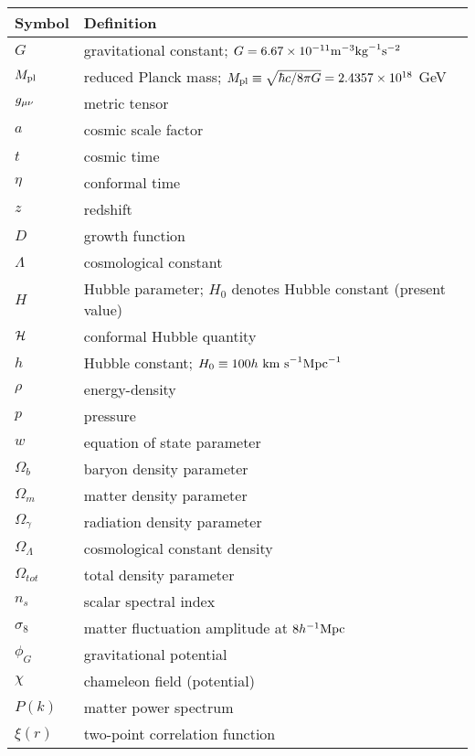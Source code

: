 
\begin{tabular}{ll}
\hline\hline
Symbol & Definition \\
\hline
$G$ & gravitational constant; $G=6.67\times10^{-11}\rm{m}^{-3}\rm{kg}^{-1}\rm{s}^{-2}$ \\
$M_{\text{\scriptsize pl}}$ & reduced Planck mass; $M_{\text{\scriptsize pl}}\equiv\sqrt{\hbar c/8\pi G} = 2.4357\times10^{18}$ GeV\\
$g_{\mu\nu}$ & metric tensor \\
$a$ & cosmic scale factor \\
$t$ & cosmic time \\
$\eta$ & conformal time \\
$z$ & redshift \\
$D$ & growth function \\
$\Lambda$ & cosmological constant \\
$H$ & Hubble parameter; $H_0$ denotes Hubble constant (present value) \\
$\mathcal{H}$ & conformal Hubble quantity \\
$h$ & Hubble constant; $H_0\equiv100 h \rm{\ km\ s}^{-1}\rm{Mpc}^{-1}$ \\
$\rho$ & energy-density \\
$p$ & pressure \\
$w$ & equation of state parameter \\
$\Omega_b$ & baryon density parameter \\
$\Omega_m$ & matter density parameter \\
$\Omega_\gamma$ & radiation density parameter \\
$\Omega_\Lambda$ & cosmological constant density \\
$\Omega_{tot}$ & total density parameter \\
$n_s$ & scalar spectral index \\
$\sigma_8$ & matter fluctuation amplitude at $8h^{-1}\text{Mpc}$ \\
$\phi_G$ & gravitational potential \\
$\chi$ & chameleon field (potential) \\
$P(k)$ & matter power spectrum \\
$\xi(r)$ & two-point correlation function \\
\hline


\hline\hline
\end{tabular}
